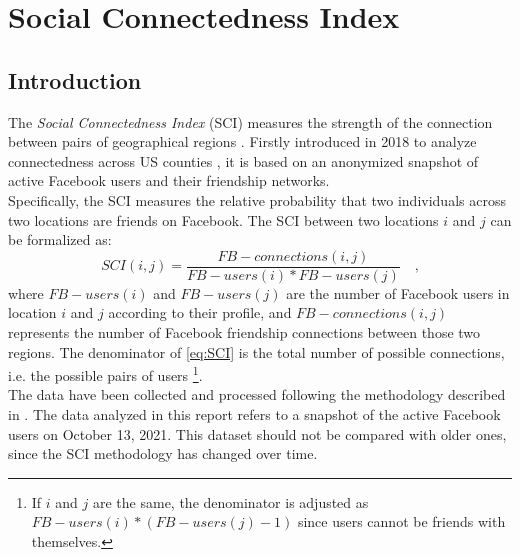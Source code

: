 \chapter{Social Connectedness Index}

\section{Introduction}
The \emph{Social Connectedness Index} (SCI) measures the strength of the connection between pairs of geographical regions \cite{MetaForGood}. Firstly introduced in 2018 to analyze connectedness across US counties \cite{bailey2018social}, it is based on an anonymized snapshot of active Facebook users and their friendship networks. \\
Specifically, the SCI measures the relative probability that two individuals across two locations are friends on Facebook. The SCI between two locations $i$ and $j$ can be formalized as:
\begin{equation}
    SCI(i, j) = \frac{FB-connections(i, j)}{FB-users(i)*FB-users(j)} \quad \text{,}
\label{eq:SCI}
\end{equation}
where $FB-users(i)$ and $FB-users(j)$ are the number of Facebook users in location $i$ and $j$ according to their profile, and $FB-connections(i, j)$ represents the number of Facebook friendship connections between those two regions. The denominator of \eqref{eq:SCI} is the total number of possible connections, i.e. the possible pairs of users \footnote{If $i$ and $j$ are the same, the denominator is adjusted as $FB-users(i)*(FB-users(j)-1)$ since users cannot be friends with themselves.}. \\
The data have been collected and processed following the methodology described in \cite{MetaForGood}. %
The data analyzed in this report refers to a snapshot of the active Facebook users on October 13, 2021. This dataset should not be compared with older ones, since the SCI methodology has changed over time. \\
